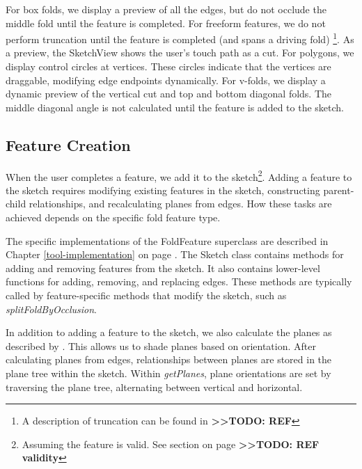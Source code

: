 For box folds, we display a preview of all the edges, but do not occlude
the middle fold until the feature is completed. For freeform features,
we do not perform truncation until the feature is completed (and spans a
driving fold) \footnote{A description of truncation can be found in
  \textbf{\textgreater{}\textgreater{}TODO: REF}}. As a preview, the
SketchView shows the user's touch path as a cut. For polygons, we
display control circles at vertices. These circles indicate that the
vertices are draggable, modifying edge endpoints dynamically. For
v-folds, we display a dynamic preview of the vertical cut and top and
bottom diagonal folds. The middle diagonal angle is not calculated until
the feature is added to the sketch.

\subsection{Feature Creation}\label{feature-creation}

When the user completes a feature, we add it to the sketch\footnote{Assuming
  the feature is valid. See section on page
  \textbf{\textgreater{}\textgreater{}TODO: REF validity}}. Adding a
feature to the sketch requires modifying existing features in the
sketch, constructing parent-child relationships, and recalculating
planes from edges. How these tasks are achieved depends on the specific
fold feature type.

The specific implementations of the FoldFeature superclass are described
in Chapter \ref{tool-implementation} on page
\pageref{tool-implementation}. The Sketch class contains methods for
adding and removing features from the sketch. It also contains
lower-level functions for adding, removing, and replacing edges. These
methods are typically called by feature-specific methods that modify the
sketch, such as \emph{splitFoldByOcclusion}.

In addition to adding a feature to the sketch, we also calculate the
planes as described by \citet{mallen}. This allows us to shade planes
based on orientation. After calculating planes from edges, relationships
between planes are stored in the plane tree within the sketch. Within
\emph{getPlanes}, plane orientations are set by traversing the plane
tree, alternating between vertical and horizontal.

